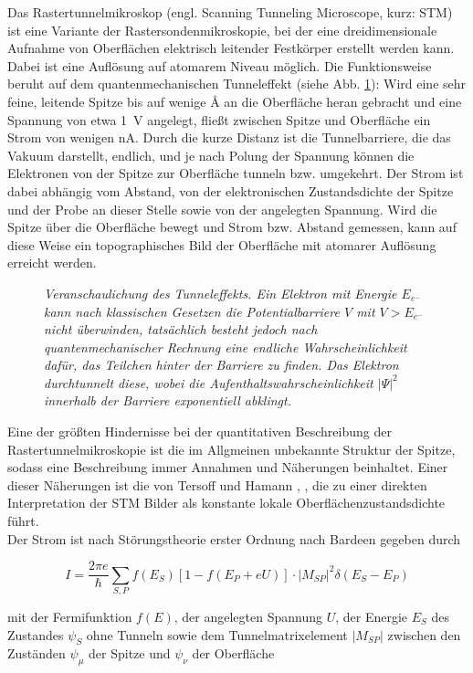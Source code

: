 Das Rastertunnelmikroskop (engl. Scanning Tunneling Microscope, kurz: STM) ist eine Variante der
Rastersondenmikroskopie, bei der eine dreidimensionale Aufnahme von Oberflächen elektrisch
leitender Festkörper erstellt werden kann. Dabei ist eine Auflösung auf atomarem Niveau möglich. Die
Funktionsweise beruht auf dem quantenmechanischen Tunneleffekt (siehe Abb. \ref{tunnel}): Wird eine
sehr feine, leitende Spitze bis auf wenige {\AA} an die Oberfläche heran gebracht und eine Spannung
von etwa \SI{1}{V} angelegt, fließt zwischen Spitze und Oberfläche ein Strom von wenigen nA. Durch
die kurze Distanz ist die Tunnelbarriere, die das Vakuum darstellt, endlich, und je nach Polung der Spannung können
die Elektronen von der Spitze zur Oberfläche tunneln bzw.
umgekehrt. Der Strom ist dabei abhängig vom Abstand, von der elektronischen Zustandsdichte der
Spitze und der Probe an dieser Stelle sowie von der angelegten Spannung. Wird die Spitze
über die Oberfläche bewegt und Strom bzw.
Abstand gemessen, kann auf diese Weise ein topographisches Bild der Oberfläche mit atomarer
Auflösung erreicht werden. 

\begin{figure}[H]
\centering
\sffamily 

\caption{\textit{Veranschaulichung des Tunneleffekts. Ein Elektron mit Energie $E_{e^-}$ kann nach
klassischen Gesetzen die Potentialbarriere $V$ mit $V>E_{e^-}$ nicht überwinden, tatsächlich besteht
jedoch nach quantenmechanischer Rechnung eine endliche Wahrscheinlichkeit dafür, das Teilchen
hinter der Barriere zu finden. Das Elektron durchtunnelt diese, wobei die
Aufenthaltswahrscheinlichkeit $|\Psi|^2$ innerhalb der Barriere exponentiell abklingt. }}
\label{tunnel}
\end{figure}


Eine der größten Hindernisse bei der quantitativen Beschreibung der Rastertunnelmikroskopie ist die
im Allgmeinen unbekannte Struktur der Spitze, sodass eine Beschreibung immer Annahmen und Näherungen
beinhaltet. Einer dieser Näherungen ist die von Tersoff und Hamann \cite{Ter83}, \cite{Ter85}, die
zu einer direkten Interpretation der STM Bilder als konstante lokale Oberflächenzustandsdichte führt.\\
Der Strom ist nach Störungstheorie erster Ordnung nach Bardeen \cite{Bar} gegeben durch

\[I=\frac{2\pi e}{\hbar}\sum_{S,P}
f(E_{S})[1-f(E_{P}+eU)]\cdot|M_{SP}|^2\delta(E_{S}-E_{P})\]

mit der Fermifunktion $f(E)$, der angelegten Spannung $U$, der Energie
$E_{S}$ des Zustandes $\psi_{S}$ ohne Tunneln sowie dem Tunnelmatrixelement $|M_{SP}|$
zwischen den Zuständen $\psi_{\mu}$ der Spitze und $\psi_{\nu}$ der Oberfläche

